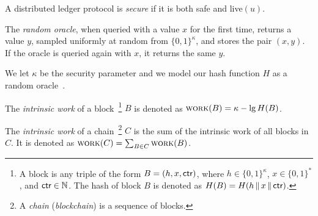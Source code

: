 \begin{definition}[Secure]
  A distributed ledger protocol is \emph{secure} if it is
  both safe and live$(u)$.
\end{definition}

\begin{definition}
  The \emph{random oracle}, when queried with a value $x$ for the first time,
  returns a value $y$, sampled uniformly at random from $\{0, 1\}^\kappa$,
  and stores the pair $(x, y)$. If the oracle
  is queried again with $x$, it returns the same $y$.
\end{definition}

We let $\kappa$ be the security parameter and we
model our hash function $H$ as a random oracle~\cite{ro}.


\begin{definition}
  The \emph{intrinsic work} of a block~\footnote{
    A block is any triple of the
    form $B = (h, x, \textsf{ctr})$, where $h \in \{0,1\}^\kappa$, $x \in \{0, 1\}^*$, and $\textsf{ctr} \in \mathbb{N}$.
    The hash of block $B$ is denoted as $H(B) = H(h \,\|\, x \,\|\, \textsf{ctr})$.
  }
  $B$ is denoted as $\textsc{work}(B) = \kappa - \lg H(B)$.
\end{definition}

\begin{definition}
  The \emph{intrinsic work} of a chain~\footnote{
    A \emph{chain} (\emph{blockchain}) is a sequence of blocks.
  }
  $C$ is the sum of the
  intrinsic work of all blocks in $C$.
  It is denoted as $\textsc{work}(C) = \sum_{B \in C}{\textsc{work}(B)}$.
\end{definition}

